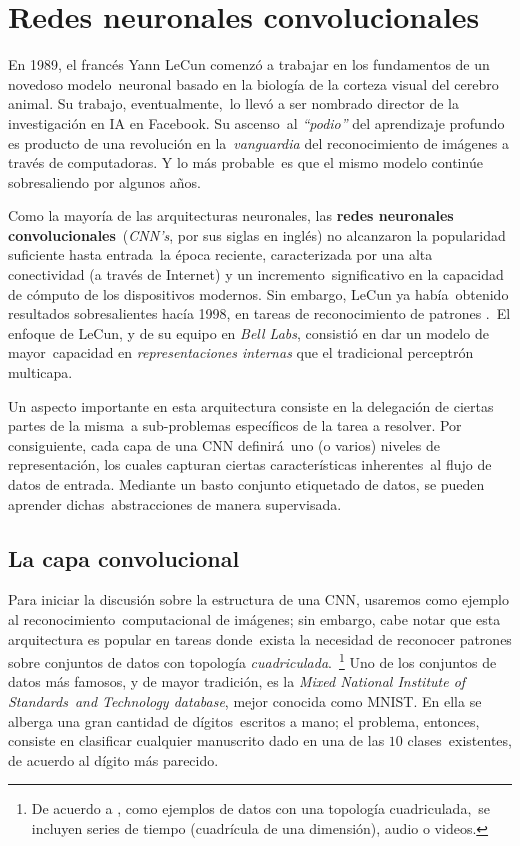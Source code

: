 \section{Redes neuronales convolucionales}

\noindent
En 1989, el francés Yann LeCun comenzó a trabajar en los fundamentos de un novedoso modelo\
neuronal basado en la biología de la corteza visual del cerebro animal. Su trabajo, eventualmente,\
lo llevó a ser nombrado director de la investigación en IA en Facebook. Su ascenso\
al \emph{``podio''} del aprendizaje profundo es producto de una revolución en la\
\emph{vanguardia} del reconocimiento de imágenes a través de computadoras. Y lo más probable\
es que el mismo modelo continúe sobresaliendo por algunos años.\par
Como la mayoría de las arquitecturas neuronales, las \textbf{redes neuronales convolucionales}\
(\emph{CNN's}, por sus siglas en inglés) no alcanzaron la popularidad suficiente hasta entrada\
la época reciente, caracterizada por una alta conectividad (a través de Internet) y un incremento\
significativo en la capacidad de cómputo de los dispositivos modernos. Sin embargo, LeCun ya había\
obtenido resultados sobresalientes hacía 1998, en tareas de reconocimiento de patrones \cite{bengio2009}.\
El enfoque de LeCun, y de su equipo en \emph{Bell Labs}, consistió en dar un modelo de mayor\
capacidad en \emph{representaciones internas} que el tradicional perceptrón multicapa.\par
Un aspecto importante en esta arquitectura consiste en la delegación de ciertas partes de la misma\
a sub-problemas específicos de la tarea a resolver. Por consiguiente, cada capa de una CNN definirá\
uno (o varios) niveles de representación, los cuales capturan ciertas características inherentes\
al flujo de datos de entrada. Mediante un basto conjunto etiquetado de datos, se pueden aprender dichas\
abstracciones de manera supervisada.

\subsection{La capa convolucional}

Para iniciar la discusión sobre la estructura de una CNN, usaremos como ejemplo al reconocimiento\
computacional de imágenes; sin embargo, cabe notar que esta arquitectura es popular en tareas donde\
exista la necesidad de reconocer patrones sobre conjuntos de datos con topología \emph{cuadriculada}.\
\footnote{De acuerdo a \cite{goodfellow-et-al-2016}, como ejemplos de datos con una topología cuadriculada,\
  se incluyen series de tiempo (cuadrícula de una dimensión), audio o videos.}
Uno de los conjuntos de datos más famosos, y de mayor tradición, es la \emph{Mixed National Institute of Standards}\
\emph{and Technology database}, mejor conocida como MNIST. En ella se alberga una gran cantidad de dígitos\
escritos a mano; el problema, entonces, consiste en clasificar cualquier manuscrito dado en una de las $10$ clases\
existentes, de acuerdo al dígito más parecido.\par

